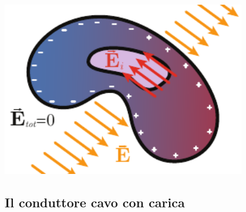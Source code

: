 \begin{minipage}{0.43\textwidth}
\begin{center}
	\includegraphics[width=0.8\textwidth]{images/chp4condcavocampoind.pdf}
\end{center}
\end{minipage}
\subsection{Il conduttore cavo con carica}
